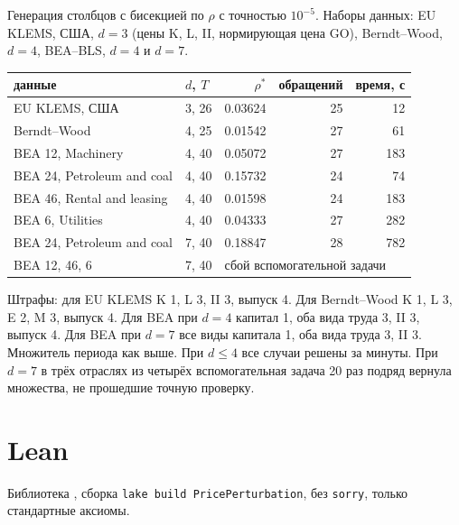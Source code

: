 \documentclass[a4paper,11pt]{article}
\newcommand{\lean}[1]{\mbox{\path{#1}}} %
\theoremstyle{plain}
\theoremstyle{definition}
\theoremstyle{remark}
\begin{document}
Генерация столбцов с бисекцией по $\rho$ с точностью $10^{-5}$. Наборы данных: EU KLEMS, США, $d=3$ (цены K, L, II, нормирующая цена GO), Berndt--Wood, $d=4$, BEA--BLS, $d=4$ и $d=7$.
\begin{center}
\begin{tabular}{llrrr}
    \toprule
    данные & $d$, $T$ & $\rho^*$ & обращений & время, с \\
    \midrule
    EU KLEMS, США & 3, 26 & 0.03624 & 25 & 12 \\
    Berndt--Wood & 4, 25 & 0.01542 & 27 & 61 \\
    BEA 12, Machinery & 4, 40 & 0.05072 & 27 & 183 \\
    BEA 24, Petroleum and coal & 4, 40 & 0.15732 & 24 & 74 \\
    BEA 46, Rental and leasing & 4, 40 & 0.01598 & 24 & 183 \\
    BEA 6, Utilities & 4, 40 & 0.04333 & 27 & 282 \\
    BEA 24, Petroleum and coal & 7, 40 & 0.18847 & 28 & 782 \\
    BEA 12, 46, 6 & 7, 40 & \multicolumn{3}{l}{сбой вспомогательной задачи} \\
    \bottomrule
\end{tabular}
\end{center}
Штрафы: для EU KLEMS K 1, L 3, II 3, выпуск 4. Для Berndt--Wood K 1, L 3, E 2, M 3, выпуск 4. Для BEA при $d=4$ капитал 1, оба вида труда 3, II 3, выпуск 4. Для BEA при $d=7$ все виды капитала 1, оба вида труда 3, II 3. Множитель периода как выше. При $d\le4$ все случаи решены за минуты. При $d=7$ в трёх отраслях из четырёх вспомогательная задача 20 раз подряд вернула множества, не прошедшие точную проверку.

\section{Lean}

Библиотека \lean{PricePerturbation}, сборка \texttt{lake build PricePerturbation}, без \texttt{sorry}, только стандартные аксиомы.
\end{document}
